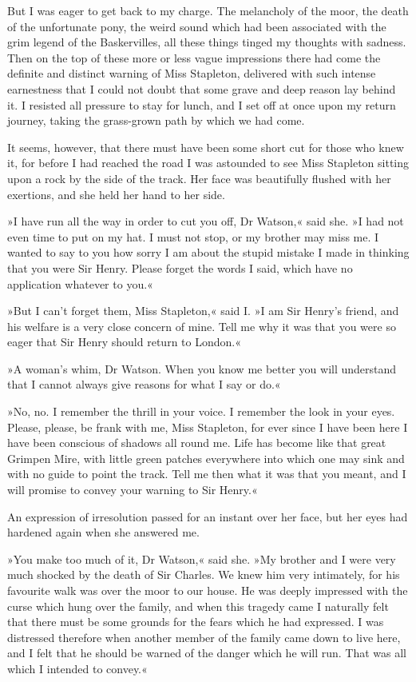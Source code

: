 But I was eager to get back to my charge. The melancholy of the moor, the death of the unfortunate pony, the weird sound which had been associated with the grim legend of the Baskervilles, all these things tinged my thoughts with sadness. Then on the top of these more or less vague impressions there had come the definite and distinct warning of Miss Stapleton, delivered with such intense earnestness that I could not doubt that some grave and deep reason lay behind it. I resisted all pressure to stay for lunch, and I set off at once upon my return journey, taking the grass-grown path by which we had come.

It seems, however, that there must have been some short cut for those who knew it, for before I had reached the road I was astounded to see Miss Stapleton sitting upon a rock by the side of the track. Her face was beautifully flushed with her exertions, and she held her hand to her side.

»I have run all the way in order to cut you off, Dr Watson,« said she. »I had not even time to put on my hat. I must not stop, or my brother may miss me. I wanted to say to you how sorry I am about the stupid mistake I made in thinking that you were Sir Henry. Please forget the words I said, which have no application whatever to you.«

»But I can't forget them, Miss Stapleton,« said I. »I am Sir Hen\-ry's friend, and his welfare is a very close concern of mine. Tell me why it was that you were so eager that Sir Henry should return to London.«

»A woman's whim, Dr Watson. When you know me better you will understand that I cannot always give reasons for what I say or do.«

»No, no. I remember the thrill in your voice. I remember the look in your eyes. Please, please, be frank with me, Miss Stapleton, for ever since I have been here I have been conscious of shadows all round me. Life has become like that great Grimpen Mire, with little green patches everywhere into which one may sink and with no guide to point the track. Tell me then what it was that you meant, and I will promise to convey your warning to Sir Henry.«

An expression of irresolution passed for an instant over her face, but her eyes had hardened again when she answered me.

»You make too much of it, Dr Watson,« said she. »My brother and I were very much shocked by the death of Sir Charles. We knew him very intimately, for his favourite walk was over the moor to our house. He was deeply impressed with the curse which hung over the family, and when this tragedy came I naturally felt that there must be some grounds for the fears which he had expressed. I was distressed therefore when another member of the family came down to live here, and I felt that he should be warned of the danger which he will run. That was all which I intended to convey.«

